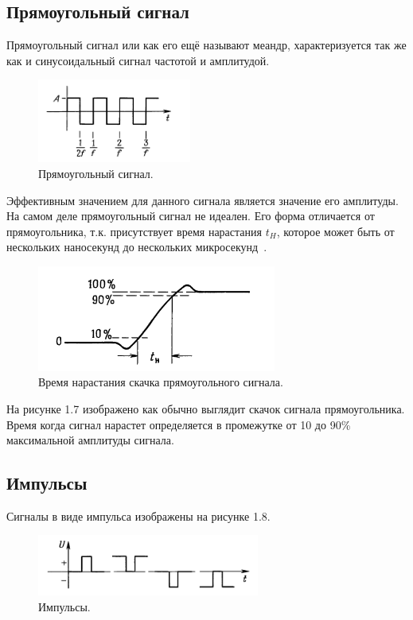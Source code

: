 \subsection{Прямоугольный сигнал}
	Прямоугольный сигнал или как его ещё называют меандр, характеризуется так же как и синусоидальный сигнал частотой и амплитудой.
	\begin{figure}[H]
    \centering
    \includegraphics[width=0.45\textwidth]{../image/s_p.png}
    \caption{Прямоугольный сигнал.}
	\end{figure}

	Эффективным значением для данного сигнала является значение его амплитуды. На самом деле прямоугольный сигнал не идеален. Его форма отличается от прямоугольника, т.к. присутствует время нарастания $t_{H}$, которое может быть от нескольких наносекунд до нескольких микросекунд~\cite{is1}.

	\begin{figure}[H]
    \centering
    \includegraphics[width=0.7\textwidth]{../image/s_p_t.png}
    \caption{Время нарастания скачка прямоугольного сигнала.}
	\end{figure}
	
	На рисунке 1.7 изображено как обычно выглядит скачок сигнала прямоугольника. Время когда сигнал нарастет определяется в промежутке от 10 до 90\% максимальной амплитуды сигнала.

\subsection{Импульсы}
Сигналы в виде импульса изображены на рисунке 1.8.

	\begin{figure}[H]
    \centering
    \includegraphics[width=0.65\textwidth]{../image/s_i.png}
    \caption{Импульсы.}
	\end{figure}
	
